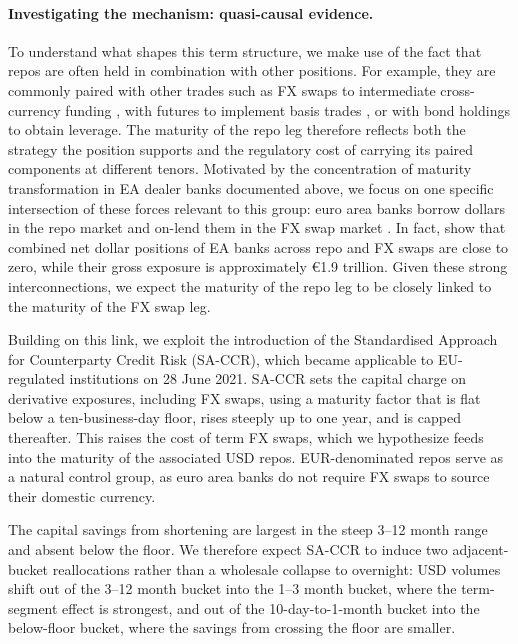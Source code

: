 \documentclass[english, 12pt, oneside]{article}
\begin{document}
\paragraph{Investigating the mechanism: quasi-causal evidence.} To understand what shapes this term structure, we make use of the fact that repos are often held in combination with other positions. For example, they are commonly paired with other trades such as FX swaps to intermediate cross-currency funding \citep{kloks2024, du2025}, with futures to implement basis trades \citep{barth2025, kashyap2025, kruttli2025ltcm}, or with bond holdings to obtain leverage. The maturity of the repo leg therefore reflects both the strategy the position supports and the regulatory cost of carrying its paired components at different tenors. Motivated by the concentration of maturity transformation in EA dealer banks documented above, we focus on one specific intersection of these forces relevant to this group: euro area banks borrow dollars in the repo market and on-lend them in the FX swap market \citep{du2025}.
In fact, \citet{du2025} show that combined net dollar positions of EA banks across repo and FX swaps are close to zero, while their gross exposure is approximately \euro 1.9 trillion. Given these strong interconnections, we expect the maturity of the repo leg to be closely linked to the maturity of the FX swap leg. 


Building on this link, we exploit the introduction of the Standardised Approach for Counterparty Credit Risk (SA-CCR), which became applicable to EU-regulated institutions on 28 June 2021. SA-CCR sets the capital charge on derivative exposures, including FX swaps, using a maturity factor that is flat below a ten-business-day floor, rises steeply up to one year, and is capped thereafter. This raises the cost of term FX swaps, which we hypothesize feeds into the maturity of the associated USD repos.
EUR-denominated repos serve as a natural control group, as euro area banks do not require FX swaps to source their domestic currency.

The capital savings from shortening are largest in the steep 3--12 month range and absent below the floor. We therefore expect SA-CCR to induce two adjacent-bucket reallocations rather than a wholesale collapse to overnight: USD volumes shift out of the 3--12 month bucket into the 1--3 month bucket, where the term-segment effect is strongest, and out of the 10-day-to-1-month bucket into the below-floor bucket, where the savings from crossing the floor are smaller.
\end{document}
